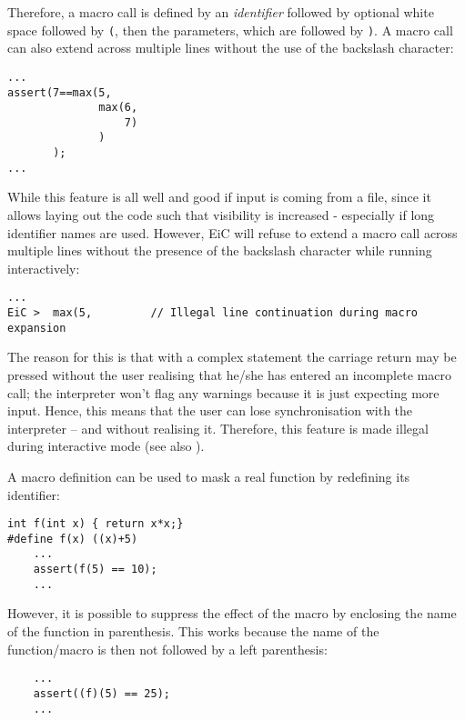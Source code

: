 Therefore, a macro call is defined by an {\it identifier} followed by
optional white space followed by \verb+(+, then the parameters, which
are followed by \verb+)+.  A macro call can also extend across
multiple lines without the use of the backslash character:
\begin{production}
\begin{verbatim}
...
assert(7==max(5,
              max(6,
                  7)
              )
       );
...
\end{verbatim}
\end{production}
While this feature is all well and good if input is coming from a
file, since it allows laying out the code such that visibility is
increased - especially if long identifier names are used.  However,
EiC will refuse to extend a macro call across multiple lines without
the presence of the backslash character while running interactively:
\begin{production}
\begin{verbatim}
...
EiC >  max(5,         // Illegal line continuation during macro expansion
\end{verbatim}
\end{production}

The reason for this is that with a complex statement the carriage
return may be pressed without the user realising that he/she has
entered an incomplete macro call; the interpreter won't flag any
warnings because it is just expecting more input. Hence, this means
that the user can lose synchronisation with the interpreter -- and
without realising it. Therefore, this feature is made illegal during
interactive mode (see also ).
 
A macro definition can be used to mask a real function by redefining its
identifier:

\begin{production}
\begin{verbatim}
int f(int x) { return x*x;}
#define f(x) ((x)+5)
    ...
    assert(f(5) == 10); 
    ...
\end{verbatim}
\end{production}

However, it is possible to suppress the effect of the macro by
enclosing the name of the function in parenthesis. This works because
the name of the function/macro is then not followed by a left
parenthesis:

\begin{production}
\begin{verbatim}
    ...
    assert((f)(5) == 25); 
    ...
\end{verbatim}
\end{production}



